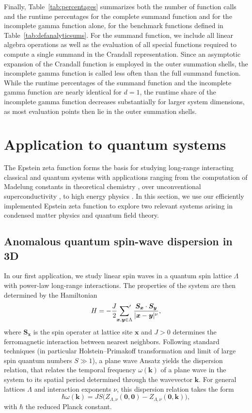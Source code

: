 \documentclass[]{amsart}
\newcommand{\new}[1]{#1}
\newcommand{\sums}{\sideset{}{'} \sum}
\numberwithin{mythm}{section}
\begin{document}
\new{Finally, Table~\ref{tab:percentages} summarizes both the number of function calls and the runtime percentages for the complete summand function and for the incomplete gamma function alone, for the benchmark functions defined in Table~\ref{tab:defanalyticsums}. For the summand function, we include all linear algebra operations as well as the evaluation of all special functions required to compute a single summand in the Crandall representation. Since an asymptotic expansion of the Crandall function is employed in the outer summation shells, the incomplete gamma function is called less often than the full summand function. While the runtime percentages of the summand function and the incomplete gamma function are nearly identical for $d=1$, the runtime share of the incomplete gamma function decreases substantially for larger system dimensions, as most evaluation points then lie in the outer summation shells.}

\section{Application to quantum systems}
\label{sec:application}

The Epstein zeta function forms the basis for studying long-range interacting classical and quantum systems with applications ranging from the computation of Madelung constants in theoretical chemistry \cite{schwerdtfeger100YearsLennardJones2024,burrowsMadelungConstantDimensions2022}, over unconventional superconductivity \cite{buchheit2023exact}, to high energy physics \cite{wolf1999exact,ambjornPropertiesVacuumMechanical1983}. In this section, we use our efficiently implemented Epstein zeta function to explore two relevant systems arising in condensed matter physics and quantum field theory.    

\subsection{Anomalous quantum spin-wave dispersion in 3D}
\label{sec:dispersion_relation}

In our first application, we study linear spin waves in a quantum spin lattice $\Lambda$ with power-law long-range interactions. The properties of the system are then determined by the Hamiltonian
\[
H=-\frac{J}{2}\sums_{\bm x,\bm y\in\Lambda}\frac{\bm S_{\bm x}\cdot \bm S_{\bm y}}{|\bm x-\bm y|^{\nu}},
\]
where
 \(\bm S_{\bm x}\) is the spin operater at lattice site \(\bm x\)  and \(J>0\) determines the ferromagnetic interaction between nearest neighbors.
 Following standard techniques (in particular Holstein--Primakoff transformation and limit of large spin quantum numbers \(S\gg 1\)), a plane wave Ansatz
yields the dispersion relation, that relates the temporal frequency $\omega(\bm k)$ of a plane wave in the system to its spatial period determined through the wavevector $\bm k$. For general lattices $\Lambda$ and interaction exponents $\nu$, this dispersion relation takes the form \cite[Appendix D]{buchheit2023exact}
\[
\hbar \omega(\bm k)=
JS\Big(\new{Z_{\Lambda,\nu}(\bm 0, \bm 0)}
-
\new{Z_{\Lambda,\nu}(\bm 0, \bm k)}\Big),
\]
with $\hbar$ the reduced Planck constant.
\end{document}
